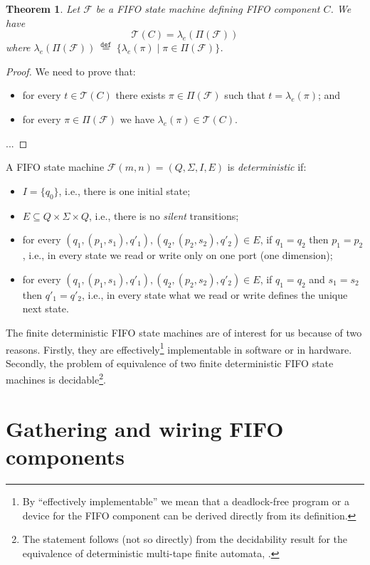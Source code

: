 \documentclass{llncs}
\newtheorem{thm}{Theorem}
\newcommand{\df}[1]{\ \stackrel{\mathtt{def}}{#1}\ }
\begin{document}
\begin{thm}
  Let $\mathcal{F}$ be a FIFO state machine defining FIFO component
  $C$. We have
  \[ \mathcal{T}(C) = \lambda_e(\Pi(\mathcal{F})) 
  \]
  where $\lambda_e(\Pi(\mathcal{F})) \df{=}
  \{\lambda_e(\pi)\mid\pi\in\Pi(\mathcal{F})\}$.
\end{thm}

\begin{proof}
  We need to prove that:
  \begin{itemize}
  \item for every $t\in \mathcal{T}(C)$ there exists
    $\pi\in\Pi(\mathcal{F})$ such that $t = \lambda_e(\pi)$; and
  \item for every $\pi\in\Pi(\mathcal{F})$ we have $\lambda_e(\pi)\in
    \mathcal{T}(C)$.
  \end{itemize}

  ...
\end{proof}

A FIFO state machine $\mathcal{F}(m,n)=(Q,\Sigma,I,E)$ is
\emph{deterministic} if:
\begin{itemize}
\item $I=\{q_0\}$, i.e., there is one initial state;
\item $E\subseteq Q\times \Sigma\times Q$, i.e., there is no
  \emph{silent} transitions;
\item for every $(q_1,(p_1,s_1),q'_1), (q_2,(p_2,s_2),q'_2)\in E$, if
  $q_1=q_2$ then $p_1=p_2$, i.e., in every state we read or write only
  on one port (one dimension);
\item for every $(q_1,(p_1,s_1),q'_1), (q_2,(p_2,s_2),q'_2)\in E$, if
  $q_1=q_2$ and $s_1=s_2$ then $q'_1=q'_2$, i.e., in every state what we 
  read or write defines the unique next state.
\end{itemize} 

The finite deterministic FIFO state machines are of interest for us
because of two reasons. Firstly, they are effectively\footnote{By
  ``effectively implementable'' we mean that a deadlock-free program
  or a device for the FIFO component can be derived directly from its
  definition.}  implementable in software or in hardware. Secondly,
the problem of equivalence of two finite deterministic FIFO state
machines is decidable\footnote{The statement follows (not so directly)
  from the decidability result for the equivalence of deterministic
  multi-tape finite automata, \cite{hk-91}.}.

\section{Gathering and wiring FIFO components}
\end{document}
